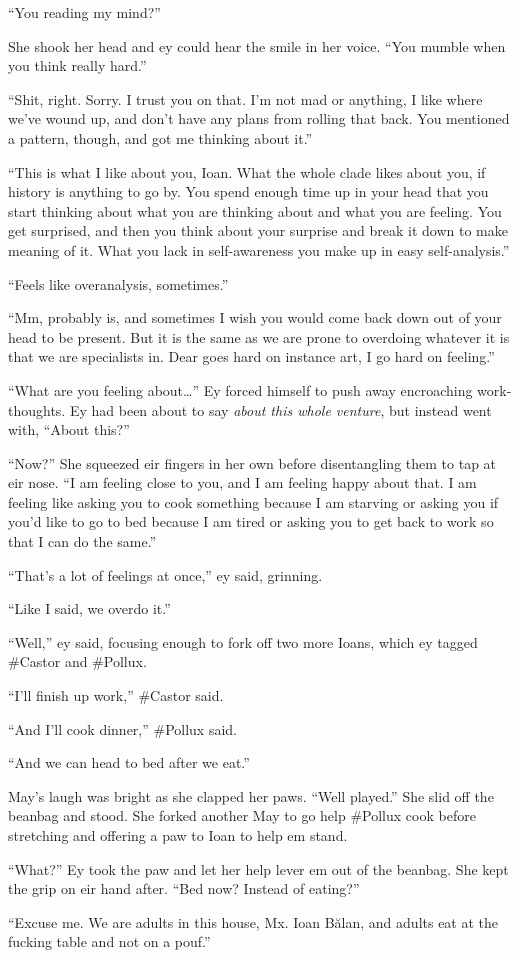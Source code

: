 ``You reading my mind?''

She shook her head and ey could hear the smile in her voice. ``You mumble when you think really hard.''

``Shit, right. Sorry. I trust you on that. I'm not mad or anything, I like where we've wound up, and don't have any plans from rolling that back. You mentioned a pattern, though, and got me thinking about it.''

``This is what I like about you, Ioan. What the whole clade likes about you, if history is anything to go by. You spend enough time up in your head that you start thinking about what you are thinking about and what you are feeling. You get surprised, and then you think about your surprise and break it down to make meaning of it. What you lack in self-awareness you make up in easy self-analysis.''

``Feels like overanalysis, sometimes.''

``Mm, probably is, and sometimes I wish you would come back down out of your head to be present. But it is the same as we are prone to overdoing whatever it is that we are specialists in. Dear goes hard on instance art, I go hard on feeling.''

``What are you feeling about\ldots{}'' Ey forced himself to push away encroaching work-thoughts. Ey had been about to say \emph{about this whole venture}, but instead went with, ``About this?''

``Now?'' She squeezed eir fingers in her own before disentangling them to tap at eir nose. ``I am feeling close to you, and I am feeling happy about that. I am feeling like asking you to cook something because I am starving or asking you if you'd like to go to bed because I am tired or asking you to get back to work so that I can do the same.''

``That's a lot of feelings at once,'' ey said, grinning.

``Like I said, we overdo it.''

``Well,'' ey said, focusing enough to fork off two more Ioans, which ey tagged \#Castor and \#Pollux.

``I'll finish up work,'' \#Castor said.

``And I'll cook dinner,'' \#Pollux said.

``And we can head to bed after we eat.''

May's laugh was bright as she clapped her paws. ``Well played.'' She slid off the beanbag and stood. She forked another May to go help \#Pollux cook before stretching and offering a paw to Ioan to help em stand.

``What?'' Ey took the paw and let her help lever em out of the beanbag. She kept the grip on eir hand after. ``Bed now? Instead of eating?''

``Excuse me. We are adults in this house, Mx. Ioan Bălan, and adults eat at the fucking table and not on a pouf.''
